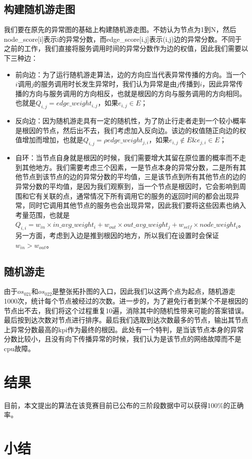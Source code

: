 \subsection{构建随机游走图}
我们要在原先的异常图的基础上构建随机游走图。不妨认为节点为1到N，然后node\_score[i]表示i的异常分数，而edge\_score[i,j]表示(i,j)边的异常分数。不同于之前的工作，我们直接将服务调用时间的异常分数作为边的权值，因此我们需要以下三种边：
\begin{itemize}
  \item 前向边：为了运行随机游走算法，边的方向应当代表异常传播的方向。当一个$i$调用$j$的服务调用时长发生异常时，我们认为异常是由$j$传播到$i$，因此异常传播的方向与服务调用的方向相反，也就是根因的方向与服务调用的方向相同。也就是$Q_{i,j} = edge\_weight_{i,j}$，如果$e_{i,j}\in E$；
  \item 反向边：因为随机游走具有一定的随机性，为了防止行走者走到一个较小概率是根因的节点，然后出不去，我们考虑加入反向边。该边的权值随正向边的权值增加而增加，也就是$Q_{i,j} = \rho edge\_weight_{j,i}$，如果$e_{i,j} \notin E \& e_{j,i} \in E$；
  \item 自环：当节点自身就是根因的时候，我们需要增大其留在原位置的概率而不走到其他地方。我们需要考虑三个因素，一是节点本身的异常分数，二是所有其他节点到该节点的边的异常分数的平均值，三是该节点到所有其他节点的边的异常分数的平均值，是因为我们观察到，当一个节点是根因时，它会影响到周围和它有关联的点，通常情况下所有调用它的服务的返回时间的都会出现异常，同时它调用其他节点的服务也会出现异常，因此我们要将这些因素也纳入考量范围，也就是$Q_{i,i} = w_{in} \times in\_avg\_weight_{i} + w_{out} \times out\_avg\_weight_{j}+ w_{self} \times node\_weight_i$。另一方面，考虑到入边是推到根因的地方，所以我们在设置时会保证$w_{in}>w_{out}$。
\end{itemize}

\subsection{随机游走}
由于$os_{021}$和$os_{022}$是整张拓扑图的入口，因此我们以这两个点为起点，随机游走1000次，统计每个节点被经过的次数。进一步的，为了避免行者到某个不是根因的节点出不去，我们将这个过程重复10遍，消除其中的随机性带来可能的答案错误。最后按到达次数对节点进行排序。最后我们选取到达次数最多的节点，输出其节点上异常分数最高的kpi作为最终的根因。此处有一个特判，是当该节点本身的异常分数比较小，且没有向下传播异常的时候，我们认为是该节点的网络故障而不是cpu故障。



\section{结果}
目前，本文提出的算法在该竞赛目前已公布的三阶段数据中可以获得100\%的正确率。

\section{小结}